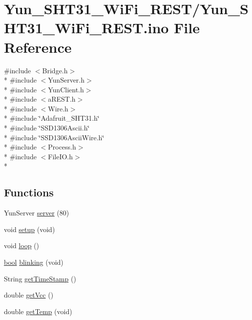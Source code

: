 \hypertarget{Yun__SHT31__WiFi__REST_8ino}{\section{Yun\-\_\-\-S\-H\-T31\-\_\-\-Wi\-Fi\-\_\-\-R\-E\-S\-T/\-Yun\-\_\-\-S\-H\-T31\-\_\-\-Wi\-Fi\-\_\-\-R\-E\-S\-T.ino File Reference}
\label{Yun__SHT31__WiFi__REST_8ino}
}
{\ttfamily \#include $<$Bridge.\-h$>$}\\*
{\ttfamily \#include $<$Yun\-Server.\-h$>$}\\*
{\ttfamily \#include $<$Yun\-Client.\-h$>$}\\*
{\ttfamily \#include $<$a\-R\-E\-S\-T.\-h$>$}\\*
{\ttfamily \#include $<$Wire.\-h$>$}\\*
{\ttfamily \#include \char`\"{}Adafruit\-\_\-\-S\-H\-T31.\-h\char`\"{}}\\*
{\ttfamily \#include \char`\"{}S\-S\-D1306\-Ascii.\-h\char`\"{}}\\*
{\ttfamily \#include \char`\"{}S\-S\-D1306\-Ascii\-Wire.\-h\char`\"{}}\\*
{\ttfamily \#include $<$Process.\-h$>$}\\*
{\ttfamily \#include $<$File\-I\-O.\-h$>$}\\*
\subsection*{Functions}
\begin{DoxyCompactItemize}
\item 
Yun\-Server \hyperlink{Yun__SHT31__WiFi__REST_8ino_a38bcb00b0f8f4fe4bb21b54dba7d1aec}{server} (80)
\item 
void \hyperlink{Yun__SHT31__WiFi__REST_8ino_a7dfd9b79bc5a37d7df40207afbc5431f}{setup} (void)
\item 
void \hyperlink{Yun__SHT31__WiFi__REST_8ino_afe461d27b9c48d5921c00d521181f12f}{loop} ()
\item 
\hyperlink{stdbool_8h_abb452686968e48b67397da5f97445f5b}{bool} \hyperlink{Yun__SHT31__WiFi__REST_8ino_a6766eee584b84ead350781efbabe36d7}{blinking} (void)
\item 
String \hyperlink{Yun__SHT31__WiFi__REST_8ino_aba13adb5d48dea106cf1c8a2d55af4d7}{get\-Time\-Stamp} ()
\item 
double \hyperlink{Yun__SHT31__WiFi__REST_8ino_a17e09a71c2603f4f10984364f358d5b7}{get\-Vcc} ()
\item 
double \hyperlink{Yun__SHT31__WiFi__REST_8ino_a11287b16260f611508b59bc017646b8b}{get\-Temp} (void)
\end{DoxyCompactItemize}
